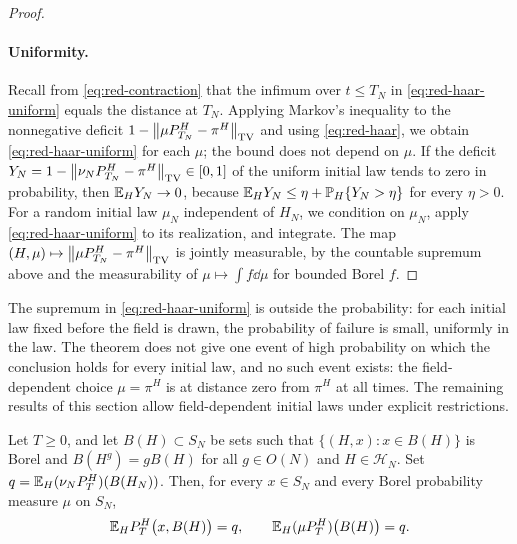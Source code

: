 \begin{proof}
\paragraph{Uniformity.}
Recall from \eqref{eq:red-contraction} that the infimum over $t\le T_N$ in \eqref{eq:red-haar-uniform} equals the distance at $T_N$. Applying Markov's inequality to the nonnegative deficit $1-\left\lVert\mu P^H_{T_N}-\pi^H\right\rVert_{\mathrm{TV}}$ and using \eqref{eq:red-haar}, we obtain \eqref{eq:red-haar-uniform} for each $\mu$; the bound does not depend on $\mu$. If the deficit $Y_N=1-\left\lVert\nu_NP^H_{T_N}-\pi^H\right\rVert_{\mathrm{TV}}\in[0,1]$ of the uniform initial law tends to zero in probability, then $\mathbb E_HY_N\to0$, because $\mathbb E_HY_N\le\eta+\mathbb P_H\{Y_N>\eta\}$ for every $\eta>0$. For a random initial law $\mu_N$ independent of $H_N$, we condition on $\mu_N$, apply \eqref{eq:red-haar-uniform} to its realization, and integrate. The map $(H,\mu)\mapsto\left\lVert\mu P^H_{T_N}-\pi^H\right\rVert_{\mathrm{TV}}$ is jointly measurable, by the countable supremum above and the measurability of $\mu\mapsto\int f\dd\mu$ for bounded Borel $f$.
\end{proof}

\begin{remark}\label{rem:red-haar-order}
The supremum in \eqref{eq:red-haar-uniform} is outside the probability: for each initial law fixed before the field is drawn, the probability of failure is small, uniformly in the law. The theorem does not give one event of high probability on which the conclusion holds for every initial law, and no such event exists: the field-dependent choice $\mu=\pi^H$ is at distance zero from $\pi^H$ at all times. The remaining results of this section allow field-dependent initial laws under explicit restrictions.
\end{remark}

\begin{lemma}\label{lem:red-equal-mass}
Let $T\ge0$, and let $B(H)\subset S_N$ be sets such that $\{(H,x):x\in B(H)\}$ is Borel and $B(H^g)=gB(H)$ for all $g\in O(N)$ and $H\in\mathcal H_N$. Set $q=\mathbb E_H(\nu_NP^H_T)(B(H_N))$. Then, for every $x\in S_N$ and every Borel probability measure $\mu$ on $S_N$,
\begin{equation}\label{eq:red-equal-mass}
\mathbb E_HP^H_T\bigl(x,B(H)\bigr)=q,\qquad\mathbb E_H(\mu P^H_T)\bigl(B(H)\bigr)=q.
\end{equation}
\end{lemma}

